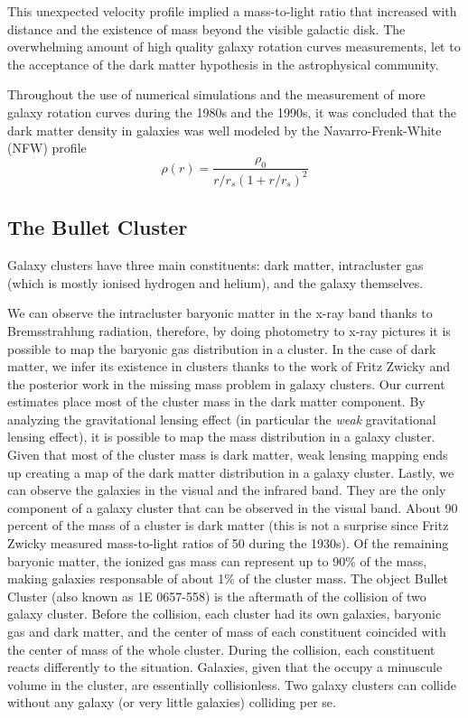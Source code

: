 This unexpected velocity profile implied a mass-to-light ratio that increased with distance and the existence of mass beyond the visible galactic disk\cite{theIsMassOutside}.
The overwhelming amount of high quality galaxy rotation curves measurements, let to the acceptance of the dark matter hypothesis in the astrophysical community.

Throughout the use of numerical simulations and the measurement of more galaxy rotation curves during the 1980s and the 1990s, it was concluded that the dark matter density in galaxies was well modeled by the Navarro-Frenk-White (NFW) profile\cite{FWN}\cite{mariangela}
\begin{equation}
\rho(r) = \frac{\rho_0}{r/r_s(1+r/r_s)^2}
\end{equation}
\subsection{The Bullet Cluster}
Galaxy clusters have three main constituents: dark matter, intracluster gas (which is mostly ionised hydrogen and helium), and the galaxy themselves.\cite{book:75345}

We can observe the intracluster baryonic matter in the x-ray band thanks to Bremsstrahlung radiation, therefore, by doing photometry to x-ray pictures it is possible to map the baryonic gas distribution in a cluster.
In the case of dark matter, we infer its existence in clusters thanks to the work of Fritz Zwicky and the posterior work in the missing mass problem in galaxy clusters.
Our current estimates place most of the cluster mass in the dark matter component.
By analyzing the gravitational lensing effect (in particular the \emph{weak} gravitational lensing effect), it is possible to map the mass distribution in a galaxy cluster. 
Given that most of the cluster mass is dark matter, weak lensing mapping ends up creating a map of the dark matter distribution in a galaxy cluster.
Lastly, we can observe the galaxies in the visual and the infrared band.
They are the only component of a galaxy cluster that can be observed in the visual band.
About 90 percent of the mass of a cluster is dark matter (this is not a surprise since Fritz Zwicky measured mass-to-light ratios of 50 during the 1930s). Of the remaining baryonic matter, the ionized gas mass can represent up to 90$\%$ of the mass, making galaxies responsable of about 1$\%$ of the cluster mass.\vspace{5mm}
The object Bullet Cluster (also known as 1E 0657-558) is the aftermath of the collision of two galaxy cluster.
Before the collision, each cluster had its own galaxies, baryonic gas and dark matter, and the center of mass of each constituent coincided with the center of mass of the whole cluster.
During the collision, each constituent reacts differently to the situation.
Galaxies, given that the occupy a minuscule volume in the cluster, are essentially collisionless. Two galaxy clusters can collide without any galaxy (or very little galaxies) colliding per se.






